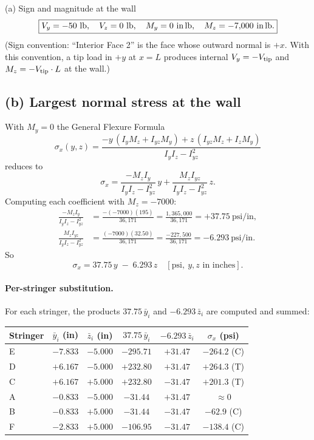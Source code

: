 \documentclass[11pt]{article}
\begin{document}
\begin{answerbox}{(a) Sign and magnitude at the wall}
\[
\boxed{V_y = -50\ \text{lb},\quad V_z = 0\ \text{lb},\quad M_y = 0\ \text{in\,lb},\quad M_z = -7{,}000\ \text{in\,lb}.}
\]
(Sign convention: ``Interior Face 2'' is the face whose outward normal is $+x$. With this convention, a tip load in $+y$ at $x = L$ produces internal $V_y = -V_{\rm tip}$ and $M_z = -V_{\rm tip}\cdot L$ at the wall.)
\end{answerbox}

\subsection*{(b) Largest normal stress at the wall}

With $M_y = 0$ the General Flexure Formula
\[
\sigma_x(y,z) = \frac{-y\,(I_y M_z + I_{yz} M_y) + z\,(I_{yz} M_z + I_z M_y)}{I_y I_z - I_{yz}^2}
\]
reduces to
\[
\sigma_x = \frac{-M_z I_y}{I_y I_z - I_{yz}^2}\,y + \frac{M_z I_{yz}}{I_y I_z - I_{yz}^2}\,z.
\]
Computing each coefficient with $M_z = -7000$:
\begin{align*}
\frac{-M_z I_y}{I_y I_z - I_{yz}^2} &= \frac{-(-7000)(195)}{36{,}171} = \frac{1{,}365{,}000}{36{,}171} = +37.75\ \text{psi/in},\\[2pt]
\frac{M_z I_{yz}}{I_y I_z - I_{yz}^2} &= \frac{(-7000)(32.50)}{36{,}171} = \frac{-227{,}500}{36{,}171} = -6.293\ \text{psi/in}.
\end{align*}
So
\[
\sigma_x = 37.75\,y \;-\; 6.293\,z\quad[\text{psi},\ y,z \text{ in inches}].
\]

\paragraph{Per-stringer substitution.} For each stringer, the products $37.75\,\bar y_i$ and $-6.293\,\bar z_i$ are computed and summed:

\begin{tabular}{lccccc}
\toprule
Stringer & $\bar y_i$ (in) & $\bar z_i$ (in) & $37.75\,\bar y_i$ & $-6.293\,\bar z_i$ & $\sigma_x$ (psi)\\
\midrule
E & $-7.833$ & $-5.000$ & $-295.71$ & $+31.47$ & $-264.2$ (C)\\
D & $+6.167$ & $-5.000$ & $+232.80$ & $+31.47$ & $\boxed{+264.3}$ (T)\\
C & $+6.167$ & $+5.000$ & $+232.80$ & $-31.47$ & $+201.3$ (T)\\
A & $-0.833$ & $-5.000$ & $-31.44$  & $+31.47$ & $\approx 0$\\
B & $-0.833$ & $+5.000$ & $-31.44$  & $-31.47$ & $-62.9$ (C)\\
F & $-2.833$ & $+5.000$ & $-106.95$ & $-31.47$ & $-138.4$ (C)\\
\bottomrule
\end{tabular}
\end{document}
